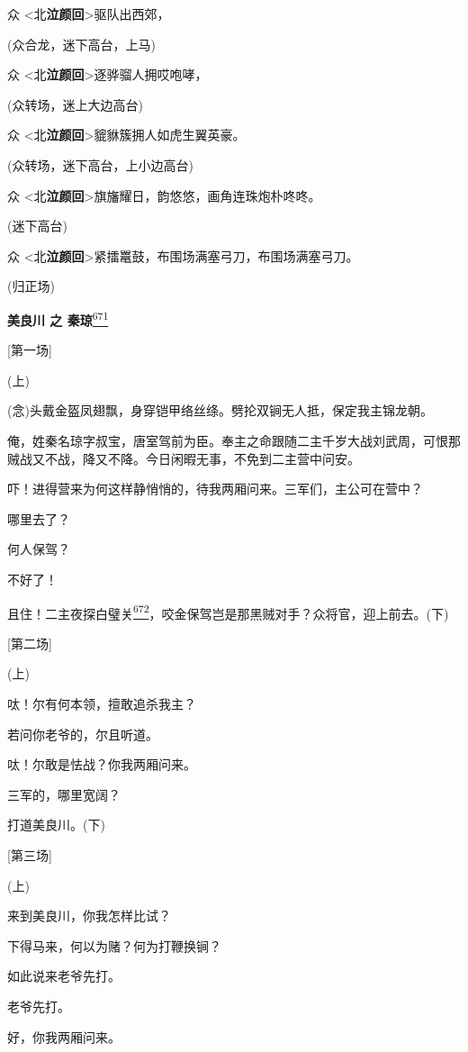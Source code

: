 众 \textless{}北\textbf{泣颜回}\textgreater{}驱队出西郊，

(众合龙，迷下高台，上马)

众 \textless{}北\textbf{泣颜回}\textgreater{}逐骅骝人拥哎咆哮，

(众转场，迷上大边高台)

众 \textless{}北\textbf{泣颜回}\textgreater{}貔貅簇拥人如虎生翼英豪。

(众转场，迷下高台，上小边高台)

众
\textless{}北\textbf{泣颜回}\textgreater{}旗旛耀日，韵悠悠，画角连珠炮朴咚咚。

(迷下高台)

众
\textless{}北\textbf{泣颜回}\textgreater{}紧擂鼍鼓，布围场满塞弓刀，布围场满塞弓刀。

(归正场)

\textbf{美良川 之 秦琼}\protect\hyperlink{fn671}{\textsuperscript{671}}

{[}第一场{]}

(上)

(念)头戴金盔凤翅飘，身穿铠甲络丝绦。劈抡双锏无人抵，保定我主锦龙朝。

俺，姓秦名琼字叔宝，唐室驾前为臣。奉主之命跟随二主千岁大战刘武周，可恨那贼战又不战，降又不降。今日闲暇无事，不免到二主营中问安。

吓！进得营来为何这样静悄悄的，待我两厢问来。三军们，主公可在营中？

哪里去了？

何人保驾？

不好了！

且住！二主夜探白璧关\protect\hyperlink{fn672}{\textsuperscript{672}}，咬金保驾岂是那黑贼对手？众将官，迎上前去。(下)

{[}第二场{]}

(上)

呔！尔有何本领，擅敢追杀我主？

若问你老爷的，尔且听道。

呔！尔敢是怯战？你我两厢问来。

三军的，哪里宽阔？

打道美良川。(下)

{[}第三场{]}

(上)

来到美良川，你我怎样比试？

下得马来，何以为赌？何为打鞭换锏？

如此说来老爷先打。

老爷先打。

好，你我两厢问来。

